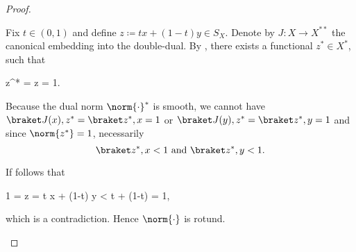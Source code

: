 \begin{proof}
\begin{enumerate}
          Fix \( t \in (0, 1) \) and define \( z \coloneqq tx + (1-t)y \in S_X \). Denote by \( J: X \to X^{**} \) the canonical embedding into the double-dual. By , there exists a functional \( z^* \in X^* \), such that
          \begin{balign*}
             {z^*}
            =
             z
            =
            1.
          \end{balign*}

          Because the dual norm \( \norm{\cdot}^* \) is smooth, we cannot have \( \inner{J(x)} {z^*} =  \inner{z^*} x = 1 \) or \( \inner{J(y)} {z^*} = \inner{z^*} y = 1 \) and since \( \norm{z^*} = 1 \), necessarily
          \begin{equation*}
            \inner{z^*} x < 1 \text{ and } \inner{z^*} y < 1.
          \end{equation*}

          If follows that
          \begin{balign*}
            1
            =
             z
            =
            t  x + (1-t)  y
            <
            t + (1-t)
            =
            1,
          \end{balign*}
          which is a contradiction. Hence \( \norm{\cdot} \) is rotund.
  \end{enumerate}
\end{proof}

